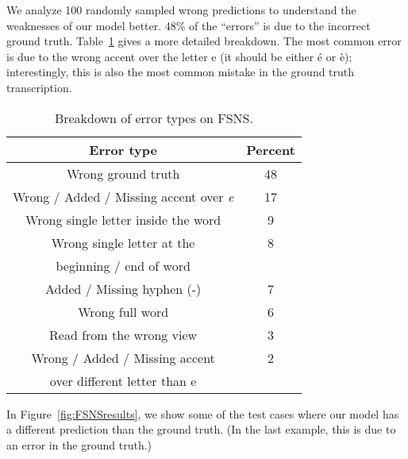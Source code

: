 \documentclass[conference]{IEEEtran}
\begin{document}
We analyze 100 randomly sampled wrong predictions to understand the
weaknesses of our model better. 48\% of the ``errors'' is
due to the incorrect ground truth. Table~\ref{tab:errors} gives a more
detailed breakdown. The most common error is due to  
the wrong accent over the letter e (it should be either \'e or \`e);
interestingly, this is also the most common mistake in the ground truth transcription.

\begin{table}[t]
\caption{Breakdown of error types on FSNS.}
\label{tab:errors}
\begin{center}
\begin{tabular}{| c | c |}
\hline Error type                           & Percent \\ \hline \hline
Wrong ground truth                          & 48 \\ \hline
Wrong / Added / Missing accent over \textit{e}       & 17 \\ \hline
Wrong single letter inside the word         & 9 \\ \hline
Wrong single letter at the                  & 8 \\
beginning / end of word                     &   \\ \hline
Added / Missing hyphen (-)                  & 7 \\ \hline
Wrong full word                             & 6 \\ \hline
Read from the wrong view                    & 3 \\ \hline
Wrong / Added / Missing accent              & 2 \\
over different letter than e                &   \\ \hline
\end{tabular}
\end{center}
\end{table}

In Figure~\ref{fig:FSNSresults}, we show some of the test cases where
our model has a different prediction than the ground truth. 
(In the last example, this is due to an error in the ground truth.)
\end{document}
